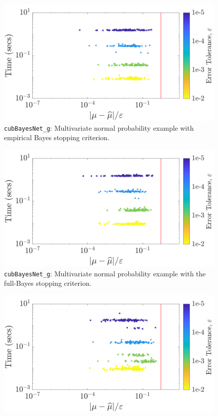 \documentclass{iitthesis}          %
\newcommand{\code}[1]{\texttt{#1}}
\begin{document}
{{{{{{\begin{figure}
\centering
\includegraphics[width=0.95\linewidth]{"Sobol/Sobol_MVN_guaranteed_time_MLE__d2_r1_2019-Jun-17"}
\caption[Sobol: MVN guaranteed: MLE]{\code{cubBayesNet\_g}: Multivariate normal probability example with empirical Bayes stopping criterion.}
\label{fig:Sobol-mvn-guaranteed-MLE}
\end{figure}
\begin{figure}
\centering
\includegraphics[width=0.95\linewidth]{"Sobol/Sobol_MVN_guaranteed_time_full__d2_r1_2019-Jun-17"}
\caption[Sobol: MVN guaranteed: Full Bayes]{\code{cubBayesNet\_g}: Multivariate normal probability example with the full-Bayes stopping criterion.}
\label{fig:Sobol-mvn-guaranteed-FB}
\end{figure}
\begin{figure}
\centering
\includegraphics[width=0.95\linewidth]{"Sobol/Sobol_MVN_guaranteed_time_GCV__d2_r1_2019-Jun-17"}

\end{figure}}}}}}}
\end{document}
